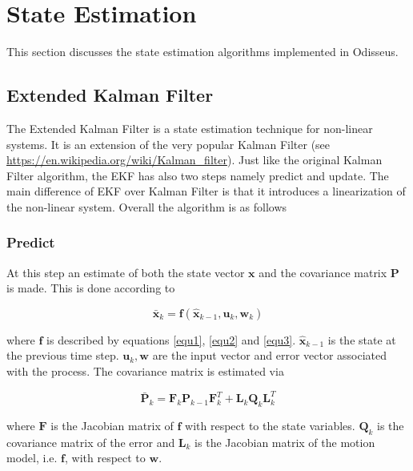\section{State Estimation}
\label{state_estimation}

This section discusses the state estimation algorithms 
implemented in Odisseus. 

\subsection{Extended Kalman Filter}
\label{extended_kalman_filter}
The Extended Kalman Filter is a state estimation technique for non-linear systems. 
It is an extension of the very popular Kalman Filter (see \url{https://en.wikipedia.org/wiki/Kalman_filter}).
Just like the original Kalman Filter algorithm, the EKF has also two steps namely predict and update. 
The main difference of EKF over Kalman Filter is that it introduces a linearization of the non-linear system. 
Overall the algorithm is as follows

\subsubsection{Predict}

At this step an estimate of both the state vector $\mathbf{x}$ and the covariance matrix $\mathbf{P}$ is made.
This is done according to

\begin{equation}
\bar{\mathbf{x}}_k = \mathbf{f}(\hat{\mathbf{x}}_{k-1}, \mathbf{u}_k, \mathbf{w}_k)
\end{equation}

where $\mathbf{f}$ is described by equations \ref{equ1},  \ref{equ2} and \ref{equ3}. $\hat{\mathbf{x}}_{k-1}$ is the state at the previous
time step. $\mathbf{u}_k, \mathbf{w}$ are the input vector and error vector associated with the process. The covariance matrix is estimated via 

\begin{equation}
\bar{\mathbf{P}}_k = \mathbf{F}_k \mathbf{P}_{k-1} \mathbf{F}_{k}^T + \mathbf{L}_k\mathbf{Q}_k\mathbf{L}_{k}^T
\end{equation}

where $\mathbf{F}$ is the Jacobian matrix of $\mathbf{f}$ with respect to the state variables. 
$\mathbf{Q}_k$ is the covariance matrix of the error and $\mathbf{L}_k$ is the Jacobian matrix of the motion
model, i.e. $\mathbf{f}$, with respect to $\mathbf{w}$.

